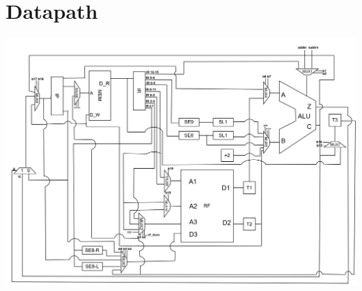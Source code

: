 \documentclass{article}
\begin{document}
\clearpage
\newpage
\section{Datapath}
    \begin{raggedleft}
    \includegraphics[width = 0.89\linewidth]
    {Images/iitb_cpu.jpg}
    \end{raggedleft}  
\end{document}
